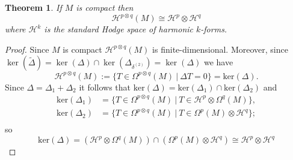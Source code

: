 \documentclass[a4paper,12pt]{article}
\newtheorem{Theorem}{Theorem}[section]
\begin{document}
\begin{Theorem}
    If $M$ is compact then 
    $$ \mathcal{H}^{p \otimes q}(M) \cong \mathcal{H}^{p} \otimes \mathcal{H}^{q}$$ where $\mathcal{H}^k$ is the standard Hodge space of harmonic $k$-forms.
\end{Theorem}
\begin{proof}
    Since $M$ is compact $ \mathcal{H}^{p \otimes q}(M)$ is finite-dimensional. Moreover, since  $\ker(\widetilde{\Delta}) = \ker(\Delta) \cap \ker({\Delta}_{\delta^{(2)}})= \ker({\Delta})$ we have
    \[\mathcal{H}^{p \otimes q}(M):=\{T \in \Omega^{p \otimes q}(M) \ | \ {\Delta}T=0\}=\text{ker}(\Delta).\] Since $\Delta=\Delta_1+\Delta_2$ it follows that $\text{ker}(\Delta)=\text{ker}(\Delta_1)\cap\text{ker}(\Delta_2)$ and 
    \begin{equation*}
    \begin{aligned}
        \text{ker}(\Delta_1)&=\{T \in \Omega^{p \otimes q}(M) \ | \ T \in \mathcal{H}^p \otimes \Omega^q(M)\},\\
        \text{ker}(\Delta_2)&=\{T \in \Omega^{p \otimes q}(M) \ | \ T \in \Omega^p(M) \otimes \mathcal{H}^q\};\\
     \end{aligned}    
    \end{equation*}
     so \[\text{ker}(\Delta) = (\mathcal{H}^p \otimes \Omega^q(M)) \cap (\Omega^p(M) \otimes \mathcal{H}^q)\cong \mathcal{H}^p \otimes \mathcal{H}^q\]
\end{proof}
\end{document}
